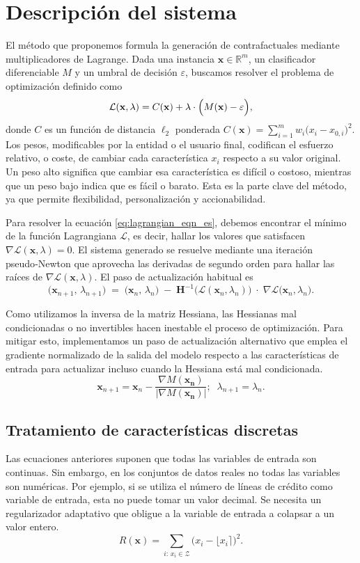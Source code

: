 \documentclass[12pt]{extarticle}
\numberwithin{equation}{section}
\begin{document}
\section*{Descripción del sistema}
El método que proponemos formula la generación de contrafactuales mediante multiplicadores de Lagrange. Dada una instancia $\mathbf{x} \in \mathbb{R}^m$, un clasificador diferenciable $M$ y un umbral de decisión $\varepsilon$, buscamos resolver el problema de optimización definido como
\begin{equation}
\label{eq:lagrangian_eqn_es}
\mathcal{L}(\mathbf{x}, \lambda) = C(\mathbf{x}) + \lambda \cdot \Bigl(M(\mathbf{x}) - \varepsilon \Bigr),
\end{equation}
donde $C$ es un función de distancia $\ell_2$ ponderada $C(\mathbf{x}) = \sum_{i=1}^m w_i\bigl(x_i - x_{0,i}\bigr)^2$. Los pesos, modificables por la entidad o el usuario final, codifican el esfuerzo relativo, o coste, de cambiar cada característica $x_i$ respecto a su valor original. Un peso alto significa que cambiar esa característica es difícil o costoso, mientras que un peso bajo indica que es fácil o barato. Esta es la parte clave del método, ya que permite flexibilidad, personalización y accionabilidad.

Para resolver la ecuación \ref{eq:lagrangian_eqn_es}, debemos encontrar el mínimo de la función Lagrangiana $\mathcal{L}$, es decir, hallar los valores que satisfacen $\nabla \mathcal{L}(\mathbf{x}, \lambda) = 0$. El sistema generado se resuelve mediante una iteración pseudo‑Newton que aprovecha las derivadas de segundo orden para hallar las raíces de $\nabla \mathcal{L}(\mathbf{x}, \lambda)$. El paso de actualización habitual es
\[
\bigl(\mathbf{x}_{n+1},\,\lambda_{n+1}\bigr)
\;=\;
\bigl(\mathbf{x}_n,\,\lambda_n\bigr)
\; -\;
\mathbf{H}^{-1}\!\bigl(\mathcal{L}(\mathbf{x}_n,\lambda_n)\bigr)
\;\cdot\;
\nabla\mathcal{L}\bigl(\mathbf{x}_n,\lambda_n\bigr).
\]

Como utilizamos la inversa de la matriz Hessiana, las Hessianas mal condicionadas o no invertibles hacen inestable el proceso de optimización. Para mitigar esto, implementamos un paso de actualización alternativo que emplea el gradiente normalizado de la salida del modelo respecto a las características de entrada para actualizar incluso cuando la Hessiana está mal condicionada.
\[
\mathbf{x}_{n+1} = \mathbf{x}_n - \frac{\nabla M(\mathbf{x_n})}{|\nabla M(\mathbf{x_n})|};\;\;
    \lambda_{n+1} = \lambda_n.
\]

\subsection*{Tratamiento de características discretas}
Las ecuaciones anteriores suponen que todas las variables de entrada son continuas. Sin embargo, en los conjuntos de datos reales no todas las variables son numéricas. Por ejemplo, si se utiliza el número de líneas de crédito como variable de entrada, esta no puede tomar un valor decimal. Se necesita un regularizador adaptativo que obligue a la variable de entrada a colapsar a un valor entero.
\[
R(\mathbf{x})=\sum_{i:\, x_i\in \mathcal{Z}}\bigl(x_i-\lfloor x_i\rceil\bigr)^2.
\]
\end{document}
